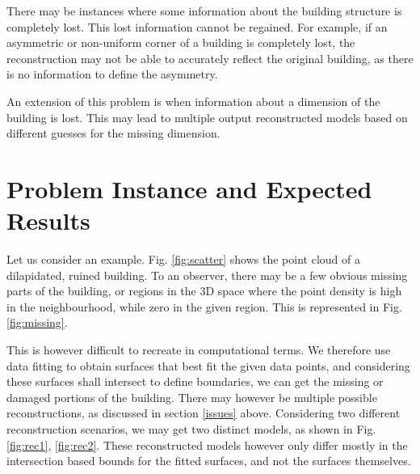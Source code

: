 \documentclass[12pt,a4paper]{article}
\begin{document}
    There may be instances where some information about the building structure is completely lost. This lost information cannot be regained. For example, if an asymmetric or non-uniform corner of a building is completely lost, the reconstruction may not be able to accurately reflect the original building, as there is no information to define the asymmetry.
    
    An extension of this problem is when information about a dimension of the building is lost. This may lead to multiple output reconstructed models based on different guesses for the missing dimension.
    
    \section{Problem Instance and Expected Results}
    
    Let us consider an example. Fig. \ref{fig:scatter} shows the point cloud of a dilapidated, ruined building. To an observer, there may be a few obvious missing parts of the building, or regions in the 3D space where the point density is high in the neighbourhood, while zero in the given region. This is represented in Fig. \ref{fig:missing}.
    
    This is however difficult to recreate in computational terms. We therefore use data fitting to obtain surfaces that best fit the given data points, and considering these surfaces shall intersect to define boundaries, we can get the missing or damaged portions of the building. There may however be multiple possible reconstructions, as discussed in section \ref{issues} above. Considering two different reconstruction scenarios, we may get two distinct models, as shown in Fig. \ref{fig:rec1}, \ref{fig:rec2}. These reconstructed models however only differ mostly in the intersection based bounds for the fitted surfaces, and not the surfaces themselves.
    
\end{document}
